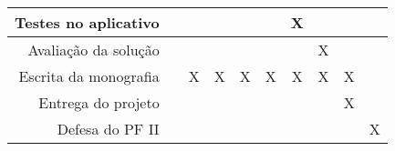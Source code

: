 \begin{table}[htp!]
{\begin{tabular}{|r|c|c|c|c|c|c|c|c|c|}
Testes no aplicativo                                                                                    &               &               &               &              &                & X             &              &             &           \\ \hline
Avaliação da solução                                                                                    &               &               &               &              &                &               & X            &             &           \\ \hline
Escrita da monografia                                                                                   &               & X             & X             & X            & X              & X             & X            & X           &           \\ \hline
Entrega do projeto                                                                                      &               &               &               &              &                &               &              & X           &           \\ \hline
Defesa do PF II                                                                                         &               &               &               &              &                &               &              &             & X         \\ \hline
\end{tabular}
}
\end{table}
